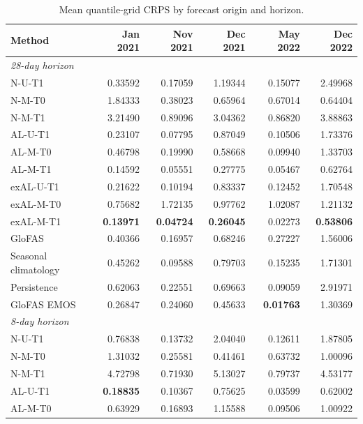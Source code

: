 \begin{table}[!htbp]
\centering
\begin{threeparttable}
\caption{Mean quantile-grid CRPS by forecast origin and horizon.}
\label{tab:crps_all_origins}
\setlength{\tabcolsep}{4pt}
\begin{tabular}{lrrrrr}
\hline
Method & Jan 2021 & Nov 2021 & Dec 2021 & May 2022 & Dec 2022 \\
\hline
\multicolumn{6}{l}{\textit{28-day horizon}} \\
N-U-T1 & 0.33592 & 0.17059 & 1.19344 & 0.15077 & 2.49968 \\
N-M-T0 & 1.84333 & 0.38023 & 0.65964 & 0.67014 & 0.64404 \\
N-M-T1 & 3.21490 & 0.89096 & 3.04362 & 0.86820 & 3.88863 \\
AL-U-T1 & 0.23107 & 0.07795 & 0.87049 & 0.10506 & 1.73376 \\
AL-M-T0 & 0.46798 & 0.19990 & 0.58668 & 0.09940 & 1.33703 \\
AL-M-T1 & 0.14592 & 0.05551 & 0.27775 & 0.05467 & 0.62764 \\
exAL-U-T1 & 0.21622 & 0.10194 & 0.83337 & 0.12452 & 1.70548 \\
exAL-M-T0 & 0.75682 & 1.72135 & 0.97762 & 1.02087 & 1.21132 \\
exAL-M-T1 & \textbf{0.13971} & \textbf{0.04724} & \textbf{0.26045} & 0.02273 & \textbf{0.53806} \\
GloFAS & 0.40366 & 0.16957 & 0.68246 & 0.27227 & 1.56006 \\
Seasonal climatology & 0.45262 & 0.09588 & 0.79703 & 0.15235 & 1.71301 \\
Persistence & 0.62063 & 0.22551 & 0.69663 & 0.09059 & 2.91971 \\
GloFAS EMOS & 0.26847 & 0.24060 & 0.45633 & \textbf{0.01763} & 1.30369 \\
\hline
\multicolumn{6}{l}{\textit{8-day horizon}} \\
N-U-T1 & 0.76838 & 0.13732 & 2.04040 & 0.12611 & 1.87805 \\
N-M-T0 & 1.31032 & 0.25581 & 0.41461 & 0.63732 & 1.00096 \\
N-M-T1 & 4.72798 & 0.71930 & 5.13027 & 0.79737 & 4.53177 \\
AL-U-T1 & \textbf{0.18835} & 0.10367 & 0.75625 & 0.03599 & 0.62002 \\
AL-M-T0 & 0.63929 & 0.16893 & 1.15588 & 0.09506 & 1.00922 \\

\end{tabular}
\end{threeparttable}
\end{table}
